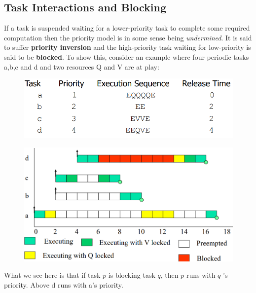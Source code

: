 \subsection{Task Interactions and Blocking}
If a task is suspended waiting for a lower-priority task to complete some required computation then the priority model is in some sense being \textit{undermined}. It is said to suffer \textbf{priority inversion} and the high-priority task waiting for low-priority is said to be \textbf{blocked}. To show this, consider an example where four periodic tasks a,b,c and d and two resources Q and V are at play:
\begin{figure}[H]
    \centering
    \includegraphics[width=0.9\linewidth]{figures/Scheduling/Priority Inversion/Overview.PNG}
\end{figure}
\begin{figure}[H]
    \centering
    \includegraphics[width=0.9\linewidth]{figures/Scheduling/Priority Inversion/Sequence.PNG}
\end{figure}
What we see here is that if task $p$ is blocking task $q$, then $p$ runs with $q$ 's priority. Above d runs with a's priority.

